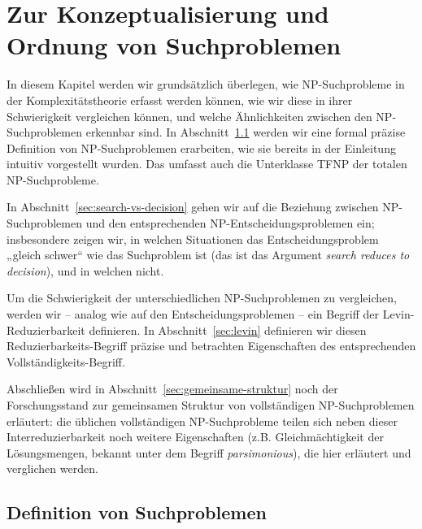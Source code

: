 \chapter{Zur Konzeptualisierung und Ordnung von Suchproblemen}\label{chap:searchproblems}

In diesem Kapitel werden wir grundsätzlich überlegen, wie NP-Suchprobleme in der Komplexitätstheorie erfasst werden können, wie wir diese in ihrer Schwierigkeit vergleichen können, und welche Ähnlichkeiten zwischen den NP-Suchproblemen erkennbar sind. 
In Abschnitt~\ref{sec:searchproblems-def} werden wir eine formal präzise Definition von NP-Suchproblemen erarbeiten, wie sie bereits in der Einleitung intuitiv vorgestellt wurden. Das umfasst auch die Unterklasse TFNP der totalen NP-Suchprobleme.

In Abschnitt~\ref{sec:search-vs-decision} gehen wir auf die Beziehung zwischen NP-Suchproblemen und den entsprechenden NP-Entscheidungsproblemen ein; insbesondere zeigen wir, in welchen Situationen das Entscheidungsproblem „gleich schwer“ wie das Suchproblem ist (das ist das Argument \emph{search reduces to decision}), und in welchen nicht.

Um die Schwierigkeit der unterschiedlichen NP-Suchproblemen zu vergleichen, werden wir -- analog wie auf den Entscheidungsproblemen -- ein Begriff der Levin-Reduzierbarkeit definieren. In Abschnitt~\ref{sec:levin} definieren wir diesen Reduzierbarkeits-Begriff präzise und betrachten Eigenschaften des entsprechenden Vollständigkeits-Begriff.

Abschließen wird in Abschnitt~\ref{sec:gemeinsame-struktur} noch der Forschungsstand zur gemeinsamen Struktur von vollständigen NP-Suchproblemen erläutert: die üblichen vollständigen NP-Suchprobleme teilen sich neben dieser Interreduzierbarkeit noch weitere Eigenschaften (z.B. Gleichmächtigkeit der Lösungsmengen, bekannt unter dem Begriff \emph{parsimonious}), die hier erläutert und verglichen werden. 

\section{Definition von Suchproblemen}\label{sec:searchproblems-def}

